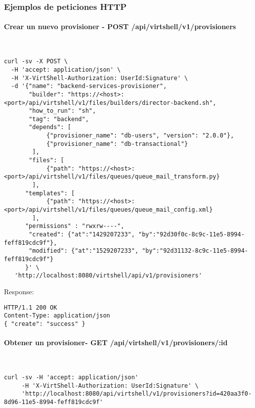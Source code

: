 \subsubsection{Ejemplos de peticiones HTTP}

\paragraph{Crear un nuevo provisioner - POST /api/virtshell/v1/provisioners} ~\\


\begin{lstlisting}[style=json]
curl -sv -X POST \
  -H 'accept: application/json' \
  -H 'X-VirtShell-Authorization: UserId:Signature' \
  -d '{"name": "backend-services-provisioner",
       "builder": "https://<host>:<port>/api/virtshell/v1/files/builders/director-backend.sh",
       "how_to_run": "sh",
       "tag": "backend",
       "depends": [
            {"provisioner_name": "db-users", "version": "2.0.0"},
            {"provisioner_name": "db-transactional"}
        ],
       "files": [
            {"path": "https://<host>:<port>/api/virtshell/v1/files/queues/queue_mail_transform.py}
        ],
      "templates": [
            {"path": "https://<host>:<port>/api/virtshell/v1/files/queues/queue_mail_config.xml}
        ],
      "permissions" : "rwxrw----",       
       "created": {"at":"1429207233", "by":"92d30f0c-8c9c-11e5-8994-feff819cdc9f"},
       "modified": {"at":"1529207233", "by":"92d31132-8c9c-11e5-8994-feff819cdc9f"}
      }' \
   'http://localhost:8080/virtshell/api/v1/provisioners'
\end{lstlisting}

Response:

\begin{lstlisting}[style=json]
HTTP/1.1 200 OK
Content-Type: application/json
{ "create": "success" }
\end{lstlisting}

\paragraph{Obtener un provisioner- GET /api/virtshell/v1/provisioners/:id} ~\\

\begin{lstlisting}[style=json]
curl -sv -H 'accept: application/json' 
     -H 'X-VirtShell-Authorization: UserId:Signature' \ 
     'http://localhost:8080/api/virtshell/v1/provisioners?id=420aa3f0-8d96-11e5-8994-feff819cdc9f'
\end{lstlisting}

